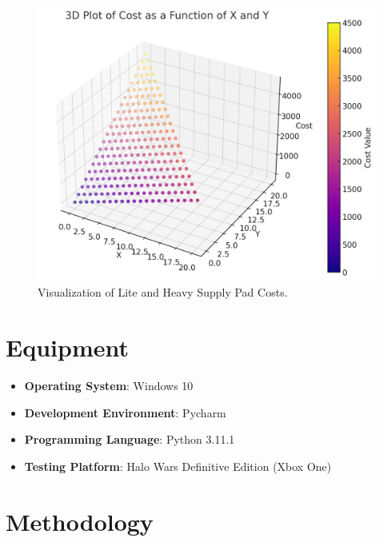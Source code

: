 \documentclass[a4paper, 12pt, english]{article}
\begin{document}
  \begin{figure}[!ht]
 			\begin{center}
				\includegraphics[width=150mm,scale=1.0]{ResourceCostForSupplyPads.png}
			\end{center}
       		\caption{\label{fig:XandYResources}Visualization of Lite and Heavy Supply Pad Costs.}
 \end{figure}

\newpage



\section{Equipment}
		\begin{itemize}
        \item  \textbf{Operating System}: Windows 10
        \item  \textbf{Development Environment}: Pycharm
        \item  \textbf{Programming Language}: Python 3.11.1
        \item  \textbf{Testing Platform}: Halo Wars Definitive Edition (Xbox One)
        
 		\end{itemize}

\newpage
\section{Methodology}
\end{document}

